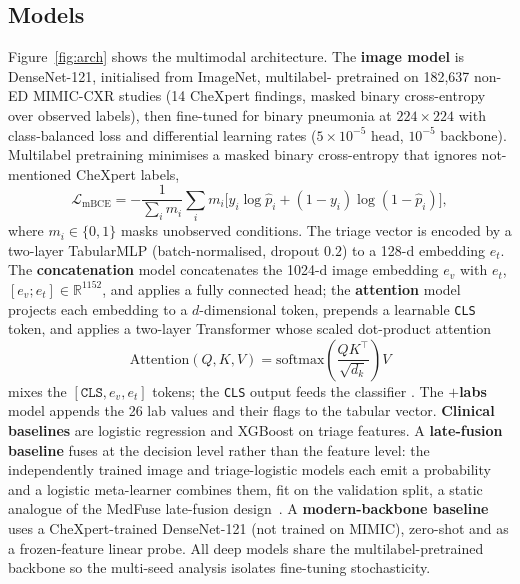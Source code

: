 \documentclass[twocolumn, final]{svjour3}
\begin{document}
\subsection{Models}
\label{subsec:models}
Figure~\ref{fig:arch} shows the multimodal architecture.
The \textbf{image model} is DenseNet-121, initialised from ImageNet, multilabel-%
pretrained on 182{,}637 non-ED MIMIC-CXR studies (14 CheXpert findings, masked
binary cross-entropy over observed labels), then fine-tuned for binary pneumonia at
$224\times224$ with class-balanced loss and differential learning rates
($5\times10^{-5}$ head, $10^{-5}$ backbone). Multilabel pretraining minimises a masked binary cross-entropy that ignores
not-mentioned CheXpert labels,
\begin{equation}
\mathcal{L}_{\text{mBCE}} = -\frac{1}{\sum_i m_i}\sum_i m_i\bigl[y_i\log\hat p_i +
(1-y_i)\log(1-\hat p_i)\bigr],
\label{eq:mbce}
\end{equation}
where $m_i\in\{0,1\}$ masks unobserved conditions. The triage vector is encoded by a
two-layer TabularMLP (batch-normalised, dropout $0.2$) to a 128-d embedding $e_t$.
The \textbf{concatenation} model concatenates the 1024-d image embedding $e_v$ with
$e_t$, $[e_v; e_t]\in\mathbb{R}^{1152}$, and applies a fully connected head; the
\textbf{attention} model projects each embedding to a $d$-dimensional token, prepends
a learnable \texttt{CLS} token, and applies a two-layer Transformer whose scaled
dot-product attention
\begin{equation}
\mathrm{Attention}(Q,K,V)=\mathrm{softmax}\!\left(\frac{QK^\top}{\sqrt{d_k}}\right)V
\label{eq:attn}
\end{equation}
mixes the $[\texttt{CLS},e_v,e_t]$ tokens; the \texttt{CLS} output feeds the
classifier \citep{acosta2022multimodal}. The \textbf{$+$labs} model appends the 26 lab
values and their flags to the tabular vector. \textbf{Clinical baselines} are
logistic regression and XGBoost \citep{chen2016xgboost} on triage features. A
\textbf{late-fusion baseline} fuses at the decision level rather than the feature
level: the independently trained image and triage-logistic models each emit a
probability and a logistic meta-learner combines them, fit on the validation split, a
static analogue of the MedFuse late-fusion design~\citep{hayat2022medfuse}. A
\textbf{modern-backbone baseline} uses a CheXpert-trained DenseNet-121
\citep{cohen2022torchxrayvision} (not trained on MIMIC), zero-shot and as a
frozen-feature linear probe. All deep models share the multilabel-pretrained backbone
so the multi-seed analysis isolates fine-tuning stochasticity.
\end{document}
